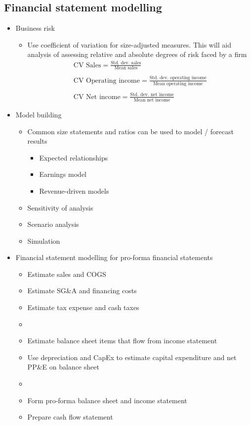 \documentclass[../notes_compiled.tex]{subfiles}
\begin{document}
\subsection{Financial statement modelling}
\begin{itemize}
\item Business risk
\begin{itemize}
\item Use coefficient of variation for size-adjusted measures. This will aid analysis of assessing relative and absolute degrees of risk faced by a firm
\begin{gather}
\text{CV Sales} = \frac{\text{Std. dev. sales}}{\text{Mean sales}} \\ \nonumber \\
\text{CV Operating income} = \frac{\text{Std. dev. operating income}}{\text{Mean operating income}} \\ \nonumber \\
\text{CV Net income} = \frac{\text{Std. dev. net income}}{\text{Mean net income}}
\end{gather}
\end{itemize}

\item Model building
\begin{itemize}
\item Common size statements and ratios can be used to model / forecast results
\begin{itemize}
\item Expected relationships
\item Earnings model
\item Revenue-driven models
\end{itemize}
\item Sensitivity of analysis
\item Scenario analysis
\item Simulation
\end{itemize}

\item Financial statement modelling for pro-forma financial statements
\begin{itemize}
\item Estimate sales and COGS
\item Estimate SG\&A and financing costs
\item Estimate tax expense and cash taxes
\item[]
\item Estimate balance sheet items that flow from income statement
\item Use depreciation and CapEx to estimate capital expenditure and net PP\&E on balance sheet
\item[]
\item Form pro-forma balance sheet and income statement
\item Prepare cash flow statement
\end{itemize}



\end{itemize}
\end{document}
